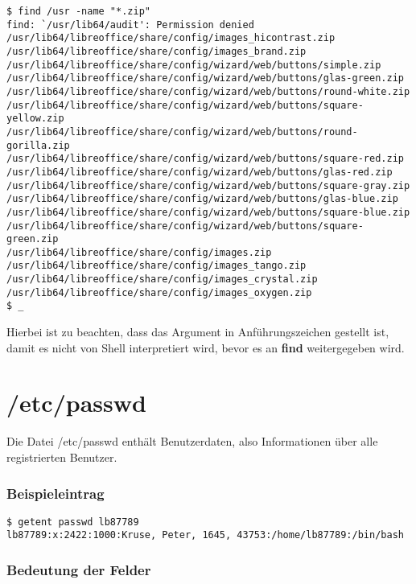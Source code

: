 \documentclass[titlepage,a4paper]{article}
\begin{document}
\begin{verbatim}
$ find /usr -name "*.zip"
find: `/usr/lib64/audit': Permission denied
/usr/lib64/libreoffice/share/config/images_hicontrast.zip
/usr/lib64/libreoffice/share/config/images_brand.zip
/usr/lib64/libreoffice/share/config/wizard/web/buttons/simple.zip
/usr/lib64/libreoffice/share/config/wizard/web/buttons/glas-green.zip
/usr/lib64/libreoffice/share/config/wizard/web/buttons/round-white.zip
/usr/lib64/libreoffice/share/config/wizard/web/buttons/square-yellow.zip
/usr/lib64/libreoffice/share/config/wizard/web/buttons/round-gorilla.zip
/usr/lib64/libreoffice/share/config/wizard/web/buttons/square-red.zip
/usr/lib64/libreoffice/share/config/wizard/web/buttons/glas-red.zip
/usr/lib64/libreoffice/share/config/wizard/web/buttons/square-gray.zip
/usr/lib64/libreoffice/share/config/wizard/web/buttons/glas-blue.zip
/usr/lib64/libreoffice/share/config/wizard/web/buttons/square-blue.zip
/usr/lib64/libreoffice/share/config/wizard/web/buttons/square-green.zip
/usr/lib64/libreoffice/share/config/images.zip
/usr/lib64/libreoffice/share/config/images_tango.zip
/usr/lib64/libreoffice/share/config/images_crystal.zip
/usr/lib64/libreoffice/share/config/images_oxygen.zip
$ _
\end{verbatim}

Hierbei ist zu beachten, dass das Argument in Anführungszeichen gestellt ist,
damit es nicht von Shell interpretiert wird, bevor es an \textbf{find}
weitergegeben wird.

\section{/etc/passwd}

Die Datei /etc/passwd enthält Benutzerdaten, also Informationen über alle
registrierten Benutzer.

\subsubsection*{Beispieleintrag}

\begin{verbatim}
$ getent passwd lb87789
lb87789:x:2422:1000:Kruse, Peter, 1645, 43753:/home/lb87789:/bin/bash
\end{verbatim}

\subsubsection*{Bedeutung der Felder}
\end{document}

